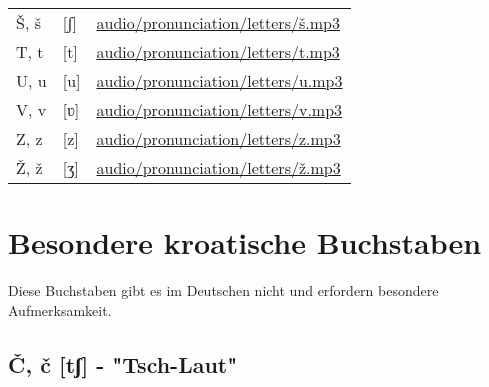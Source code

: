 \begin{center}
\begin{tabular}{lll}
Š, š & [ʃ] & \small\url{audio/pronunciation/letters/š.mp3} \\
T, t & [t] & \small\url{audio/pronunciation/letters/t.mp3} \\
U, u & [u] & \small\url{audio/pronunciation/letters/u.mp3} \\
V, v & [ʋ] & \small\url{audio/pronunciation/letters/v.mp3} \\
Z, z & [z] & \small\url{audio/pronunciation/letters/z.mp3} \\
Ž, ž & [ʒ] & \small\url{audio/pronunciation/letters/ž.mp3} \\
\bottomrule
\end{tabular}
\end{center}

\section{Besondere kroatische Buchstaben}

Diese Buchstaben gibt es im Deutschen nicht und erfordern besondere Aufmerksamkeit.

\subsection{Č, č [tʃ] - "Tsch-Laut"}

